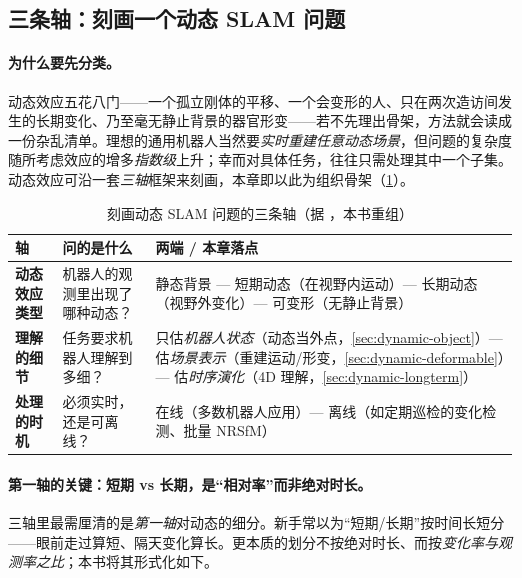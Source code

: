 \subsection{三条轴：刻画一个动态 SLAM 问题}
\label{sec:dynamic-axes}

\paragraph{为什么要先分类。}
动态效应五花八门——一个孤立刚体的平移、一个会变形的人、只在两次造访间发生的长期变化、乃至毫无静止背景的器官形变——若不先理出骨架，方法就会读成一份杂乱清单。理想的通用机器人当然要\emph{实时重建任意动态场景}，但问题的复杂度随所考虑效应的增多\emph{指数级}上升；幸而对具体任务，往往只需处理其中一个子集。动态效应可沿一套\emph{三轴}框架来刻画\cite{schmid2026dynamic}，本章即以此为组织骨架（\cref{tab:dyn-axes}）。

\begin{table}[H]\centering\small
\caption{刻画动态 SLAM 问题的三条轴（据 \cite{schmid2026dynamic}，本书重组）}
\label{tab:dyn-axes}
\begin{tabular}{p{} p{} p{}}
\toprule
轴 & 问的是什么 & 两端 / 本章落点 \\
\midrule
\textbf{动态效应类型} & 机器人的观测里出现了哪种动态？ & 静态背景 — 短期动态（在视野内运动）— 长期动态（视野外变化）— 可变形（无静止背景）\\
\textbf{理解的细节} & 任务要求机器人理解到多细？ & 只估\emph{机器人状态}（动态当外点，\cref{sec:dynamic-object}）— 估\emph{场景表示}（重建运动/形变，\cref{sec:dynamic-deformable}）— 估\emph{时序演化}（4D 理解，\cref{sec:dynamic-longterm}）\\
\textbf{处理的时机} & 必须实时，还是可离线？ & 在线（多数机器人应用）— 离线（如定期巡检的变化检测、批量 NRSfM）\\
\bottomrule
\end{tabular}
\end{table}

\paragraph{第一轴的关键：短期 vs 长期，是“相对率”而非绝对时长。}
三轴里最需厘清的是\emph{第一轴}对动态的细分。新手常以为“短期/长期”按时间长短分——眼前走过算短、隔天变化算长。更本质的划分不按绝对时长、而按\emph{变化率与观测率之比}\cite{schmid2026dynamic}；本书将其形式化如下。

